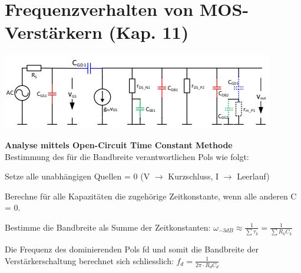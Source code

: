 
\section{Frequenzverhalten von MOS-Verstärkern (Kap. 11)}
\begin{minipage}[c]{0.5\textwidth}
	\includegraphics[width=1\linewidth]{chapters/Frequenzverhalten/images/parasitaere_kapazitaeten}
\end{minipage}
\begin{minipage}[c]{0.5\textwidth}
\textbf{Analyse mittels Open-Circuit Time Constant Methode} \\
Bestimmung des für die Bandbreite verantwortlichen Pols wie folgt:
\begin{compactenum}
	\item Setze alle unabhängigen Quellen = 0 (V $\rightarrow$ Kurzschluss, I $\rightarrow$ Leerlauf)
	\item Berechne für alle Kapazitäten die zugehörige Zeitkonstante, wenn alle anderen C = 0.
\end{compactenum}
\end{minipage}
\begin{compactenum}
	\setcounter{enumi}{2}
	\item Bestimme die Bandbreite als Summe der Zeitkonstanten: $\omega_{-3dB}\approx \frac{1}{\sum\tau_k}=\frac{1}{\sum R_kC_k}$
\end{compactenum}
Die Frequenz des dominierenden Pols fd und somit die Bandbreite der Verstärkerschaltung berechnet sich schliesslich: $f_d=\frac{1}{2\pi \cdot R_dC_d}$

